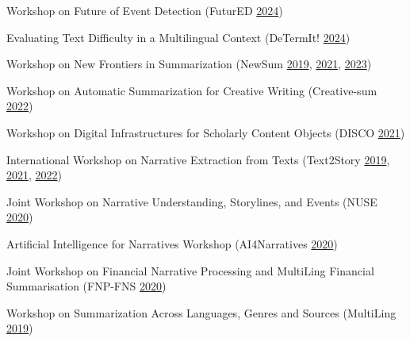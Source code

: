 \begin{itemize*}[label={},
                 itemjoin={{,\space}},
                 afterlabel={},
                 after={{.}}]

    \item Workshop on Future of Event Detection 
    (FuturED 
    \href{https://aclanthology.org/2024.futured-1.0.pdf}{2024})

    \item Evaluating Text Difficulty in a Multilingual Context
    (DeTermIt! 
    \href{https://aclanthology.org/2024.determit-1.pdf}{2024})

    \item Workshop on New Frontiers in Summarization
    (NewSum 
    \href{https://aclanthology.org/D19-5400.pdf}{2019},
    \href{https://aclanthology.org/2021.newsum-1.0.pdf}{2021},
    \href{https://aclanthology.org/2023.newsum-1.0.pdf}{2023})

    \item Workshop on Automatic Summarization for Creative Writing
    (Creative-sum
    \href{https://aclanthology.org/2022.creativesumm-1.0.pdf}{2022})

    \item Workshop on Digital Infrastructures for Scholarly Content Objects
    (DISCO 
    \href{https://ceur-ws.org/Vol-2976/xpreface.pdf}{2021})

    \item International Workshop on Narrative Extraction from Texts
    (Text2Story 
    \href{https://ceur-ws.org/Vol-2342/preface.pdf}{2019},
    \href{https://ceur-ws.org/Vol-2860/preface.pdf}{2021},
    \href{https://ceur-ws.org/Vol-3117/preface.pdf}{2022})

    \item Joint Workshop on Narrative Understanding, Storylines, and Events 
    (NUSE
    \href{https://aclanthology.org/2020.nuse-1.0.pdf}{2020})

    \item Artificial Intelligence for Narratives Workshop
    (AI4Narratives
    \href{https://ceur-ws.org/Vol-2794/preface.pdf}{2020})

    \item Joint Workshop on Financial Narrative Processing and MultiLing Financial Summarisation
    (FNP-FNS 
    \href{https://aclanthology.org/2020.fnp-1.0.pdf}{2020})

    \item Workshop on Summarization Across Languages, Genres and Sources
    (MultiLing
    \href{https://aclanthology.org/W19-8900.pdf}{2019})
\end{itemize*}

